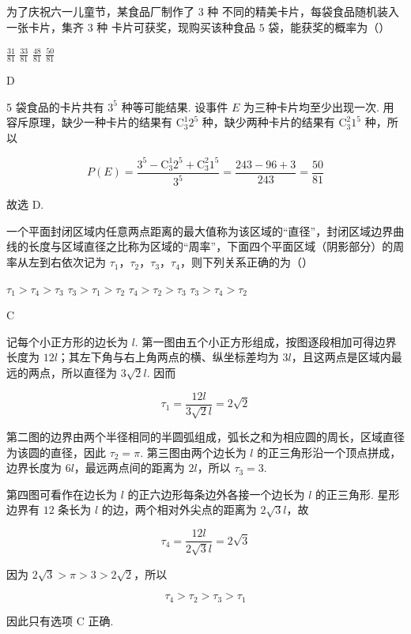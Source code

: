 \begin{problem}
为了庆祝六一儿童节，某食品厂制作了 \(3\text{ 种}\) 不同的精美卡片，每袋食品随机装入一张卡片，集齐 \(3\text{ 种}\) 卡片可获奖，现购买该种食品 \(5\text{ 袋}\)，能获奖的概率为（\quad）

\choices
    {\( \frac{31}{81} \)}
    {\( \frac{33}{81} \)}
    {\( \frac{48}{81} \)}
    {\( \frac{50}{81} \)}
\end{problem}

\begin{answer}
D
\end{answer}

\begin{solution}
5 袋食品的卡片共有 \(3^5\) 种等可能结果. 设事件 \(E\) 为三种卡片均至少出现一次. 用容斥原理，缺少一种卡片的结果有 \(\mathrm C_3^1 2^5\) 种，缺少两种卡片的结果有 \(\mathrm C_3^2 1^5\) 种，所以

\[
P(E)=\frac{3^5-\mathrm C_3^1 2^5+\mathrm C_3^2 1^5}{3^5}
=\frac{243-96+3}{243}=\frac{50}{81}
\]

故选 D.
\end{solution}

\begin{problem}
一个平面封闭区域内任意两点距离的最大值称为该区域的“直径”，封闭区域边界曲线的长度与区域直径之比称为区域的“周率”，下面四个平面区域（阴影部分）的周率从左到右依次记为 \(\tau_{1}\)，\(\tau_{2}\)，\(\tau_{3}\)，\(\tau_{4}\)，则下列关系正确的为（\quad）


\choices
    {\(\tau_{1} > \tau_{4} > \tau_{3}\)}
    {\(\tau_{3} > \tau_{1} > \tau_{2}\)}
    {\(\tau_{4} > \tau_{2} > \tau_{3}\)}
    {\(\tau_{3} > \tau_{4} > \tau_{2}\)}
\end{problem}

\begin{answer}
C
\end{answer}

\begin{solution}
记每个小正方形的边长为 \(l\). 第一图由五个小正方形组成，按图逐段相加可得边界长度为 \(12l\)；其左下角与右上角两点的横、纵坐标差均为 \(3l\)，且这两点是区域内最远的两点，所以直径为 \(3\sqrt{2}l\). 因而

\[
\tau_1=\frac{12l}{3\sqrt{2}l}=2\sqrt{2}
\]

第二图的边界由两个半径相同的半圆弧组成，弧长之和为相应圆的周长，区域直径为该圆的直径，因此 \(\tau_2=\pi\). 第三图由两个边长为 \(l\) 的正三角形沿一个顶点拼成，边界长度为 \(6l\)，最远两点间的距离为 \(2l\)，所以 \(\tau_3=3\).

第四图可看作在边长为 \(l\) 的正六边形每条边外各接一个边长为 \(l\) 的正三角形. 星形边界有 \(12\) 条长为 \(l\) 的边，两个相对外尖点的距离为 \(2\sqrt3l\)，故

\[
\tau_4=\frac{12l}{2\sqrt3l}=2\sqrt3
\]

因为 \(2\sqrt3>\pi>3>2\sqrt2\)，所以

\[
\tau_4>\tau_2>\tau_3>\tau_1
\]

因此只有选项 C 正确.
\end{solution}

